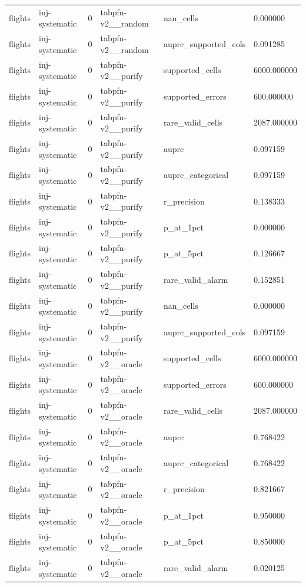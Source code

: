 \begin{tabular}{llllll}
flights & inj-systematic & 0 & tabpfn-v2\_\_random & nan\_cells & 0.000000 \\
flights & inj-systematic & 0 & tabpfn-v2\_\_random & auprc\_supported\_cols & 0.091285 \\
flights & inj-systematic & 0 & tabpfn-v2\_\_purify & supported\_cells & 6000.000000 \\
flights & inj-systematic & 0 & tabpfn-v2\_\_purify & supported\_errors & 600.000000 \\
flights & inj-systematic & 0 & tabpfn-v2\_\_purify & rare\_valid\_cells & 2087.000000 \\
flights & inj-systematic & 0 & tabpfn-v2\_\_purify & auprc & 0.097159 \\
flights & inj-systematic & 0 & tabpfn-v2\_\_purify & auprc\_categorical & 0.097159 \\
flights & inj-systematic & 0 & tabpfn-v2\_\_purify & r\_precision & 0.138333 \\
flights & inj-systematic & 0 & tabpfn-v2\_\_purify & p\_at\_1pct & 0.000000 \\
flights & inj-systematic & 0 & tabpfn-v2\_\_purify & p\_at\_5pct & 0.126667 \\
flights & inj-systematic & 0 & tabpfn-v2\_\_purify & rare\_valid\_alarm & 0.152851 \\
flights & inj-systematic & 0 & tabpfn-v2\_\_purify & nan\_cells & 0.000000 \\
flights & inj-systematic & 0 & tabpfn-v2\_\_purify & auprc\_supported\_cols & 0.097159 \\
flights & inj-systematic & 0 & tabpfn-v2\_\_oracle & supported\_cells & 6000.000000 \\
flights & inj-systematic & 0 & tabpfn-v2\_\_oracle & supported\_errors & 600.000000 \\
flights & inj-systematic & 0 & tabpfn-v2\_\_oracle & rare\_valid\_cells & 2087.000000 \\
flights & inj-systematic & 0 & tabpfn-v2\_\_oracle & auprc & 0.768422 \\
flights & inj-systematic & 0 & tabpfn-v2\_\_oracle & auprc\_categorical & 0.768422 \\
flights & inj-systematic & 0 & tabpfn-v2\_\_oracle & r\_precision & 0.821667 \\
flights & inj-systematic & 0 & tabpfn-v2\_\_oracle & p\_at\_1pct & 0.950000 \\
flights & inj-systematic & 0 & tabpfn-v2\_\_oracle & p\_at\_5pct & 0.850000 \\
flights & inj-systematic & 0 & tabpfn-v2\_\_oracle & rare\_valid\_alarm & 0.020125 \\

\end{tabular}
